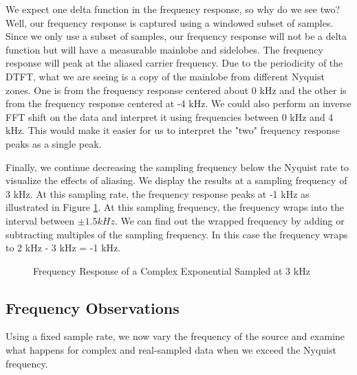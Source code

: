\documentclass{article}
\begin{document}
We expect one delta function in the frequency response, so why do we see two? Well, our frequency response is captured using a windowed subset of samples. Since we only use a subset of samples, our frequency response will not be a delta function but will have a measurable mainlobe and sidelobes. The frequency response will peak at the aliased carrier frequency. Due to the periodicity of the DTFT, what we are seeing is a copy of the mainlobe from different Nyquist zones. One is from the frequency response centered about 0 kHz and the other is from the frequency response centered at -4 kHz. We could also perform an inverse FFT shift on the data and interpret it using frequencies between 0 kHz and 4 kHz. This would make it easier for us to interpret the "two" frequency response peaks as a single peak.

Finally, we continue decreasing the sampling frequency below the Nyquist rate to visualize the effects of aliasing. We display the results at a sampling frequency of 3 kHz. At this sampling rate, the frequency response peaks at -1 kHz as illustrated in Figure \ref{fig::complex_sampling_freq_domain_3k_samp_rate}. At this sampling frequency, the frequency wraps into the interval between $\pm 1.5 kHz$. We can find out the wrapped frequency by adding or subtracting multiples of the sampling frequency. In this case the frequency wraps to 2 kHz - 3 kHz = -1 kHz.

\begin{figure}[H]
	\centerline{}
	\caption{Frequency Response of a Complex Exponential Sampled at 3 kHz}
	\label{fig::complex_sampling_freq_domain_3k_samp_rate}
\end{figure}

\subsection{Frequency Observations}

Using a fixed sample rate, we now vary the frequency of the source and examine what happens for complex and real-sampled data when we exceed the Nyquist frequency.
\end{document}

